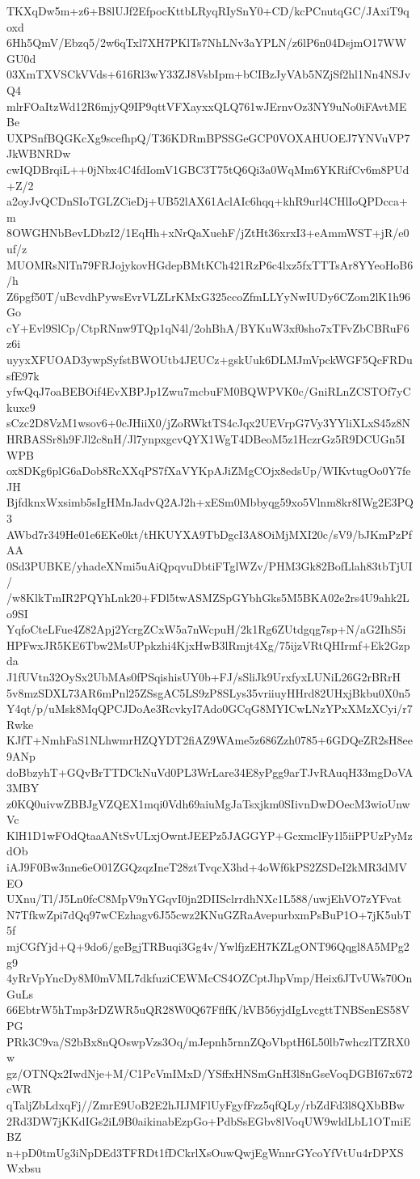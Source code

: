 TKXqDw5m+z6+B8lUJf2EfpocKttbLRyqRIySnY0+CD/kcPCnutqGC/JAxiT9qoxd
6Hh5QmV/Ebzq5/2w6qTxl7XH7PKlTs7NhLNv3aYPLN/z6lP6n04DsjmO17WWGU0d
03XmTXVSCkVVds+616Rl3wY33ZJ8VsbIpm+bCIBzJyVAb5NZjSf2hl1Nn4NSJvQ4
mlrFOaItzWd12R6mjyQ9IP9qttVFXayxxQLQ761wJErnvOz3NY9uNo0iFAvtMEBe
UXPSnfBQGKcXg9scefhpQ/T36KDRmBPSSGeGCP0VOXAHUOEJ7YNVuVP7JkWBNRDw
cwIQDBrqiL++0jNbx4C4fdIomV1GBC3T75tQ6Qi3a0WqMm6YKRifCv6m8PUd+Z/2
a2oyJvQCDnSIoTGLZCieDj+UB52lAX61AclAIc6hqq+khR9url4CHlIoQPDcca+m
8OWGHNbBevLDbzI2/1EqHh+xNrQaXuehF/jZtHt36xrxI3+eAmmWST+jR/e0uf/z
MUOMRsNlTn79FRJojykovHGdepBMtKCh421RzP6c4lxz5fxTTTsAr8YYeoHoB6/h
Z6pgf50T/uBcvdhPywsEvrVLZLrKMxG325ccoZfmLLYyNwIUDy6CZom2lK1h96Go
cY+Evl9SlCp/CtpRNnw9TQp1qN4l/2ohBhA/BYKuW3xf0sho7xTFvZbCBRuF6z6i
uyyxXFUOAD3ywpSyfstBWOUtb4JEUCz+gskUuk6DLMJmVpckWGF5QcFRDusfE97k
yfwQqJ7oaBEBOif4EvXBPJp1Zwu7mcbuFM0BQWPVK0c/GniRLnZCSTOf7yCkuxc9
sCzc2D8VzM1wsov6+0cJHiiX0/jZoRWktTS4cJqx2UEVrpG7Vy3YYliXLxS45z8N
HRBASSr8h9FJl2c8nH/Jl7ynpxgcvQYX1WgT4DBeoM5z1HczrGz5R9DCUGn5IWPB
ox8DKg6plG6aDob8RcXXqPS7fXaVYKpAJiZMgCOjx8edsUp/WIKvtugOo0Y7feJH
BjfdknxWxsimb5sIgHMnJadvQ2AJ2h+xESm0Mbbyqg59xo5Vlnm8kr8IWg2E3PQ3
AWbd7r349He01e6EKe0kt/tHKUYXA9TbDgcI3A8OiMjMXI20c/sV9/bJKmPzPfAA
0Sd3PUBKE/yhadeXNmi5uAiQpqvuDbtiFTglWZv/PHM3Gk82BofLlah83tbTjUI/
/w8KlkTmIR2PQYhLnk20+FDl5twASMZSpGYbhGks5M5BKA02e2rs4U9ahk2Lo9SI
YqfoCteLFue4Z82Apj2YcrgZCxW5a7nWcpuH/2k1Rg6ZUtdgqg7sp+N/aG2IhS5i
HPFwxJR5KE6Tbw2MsUPpkzhi4KjxHwB3lRmjt4Xg/75ijzVRtQHIrmf+Ek2Gzpda
J1fUVtn32OySx2UbMAs0fPSqishisUY0b+FJ/sSliJk9UrxfyxLUNiL26G2rBRrH
5v8mzSDXL73AR6mPnl25ZSsgAC5LS9zP8SLys35vriiuyHHrd82UHxjBkbu0X0n5
Y4qt/p/uMsk8MqQPCJDoAe3RcvkyI7Ado0GCqG8MYICwLNzYPxXMzXCyi/r7Rwke
KJfT+NmhFaS1NLhwmrHZQYDT2fiAZ9WAme5z686Zzh0785+6GDQeZR2sH8ee9ANp
doBbzyhT+GQvBrTTDCkNuVd0PL3WrLare34E8yPgg9arTJvRAuqH33mgDoVA3MBY
z0KQ0uivwZBBJgVZQEX1mqi0Vdh69aiuMgJaTsxjkm0SIivnDwDOecM3wioUnwVc
KlH1D1wFOdQtaaANtSvULxjOwntJEEPz5JAGGYP+GcxmclFy1l5iiPPUzPyMzdOb
iAJ9F0Bw3nne6eO01ZGQzqzIneT28ztTvqcX3hd+4oWf6kPS2ZSDeI2kMR3dMVEO
UXnu/Tl/J5Ln0fcC8MpV9nYGqvI0jn2DIISclrrdhNXc1L588/uwjEhVO7zYFvat
N7TfkwZpi7dQq97wCEzhagv6J55cwz2KNuGZRaAvepurbxmPsBuP1O+7jK5ubT5f
mjCGfYjd+Q+9do6/geBgjTRBuqi3Gg4v/YwlfjzEH7KZLgONT96Qqgl8A5MPg2g9
4yRrVpYncDy8M0mVML7dkfuziCEWMcCS4OZCptJhpVmp/Heix6JTvUWs70OnGuLs
66EbtrW5hTmp3rDZWR5uQR28W0Q67FflfK/kVB56yjdIgLvcgttTNBSenES58VPG
PRk3C9va/S2bBx8nQOswpVzs3Oq/mJepnh5rnnZQoVbptH6L50lb7whczlTZRX0w
gz/OTNQx2IwdNje+M/C1PcVmIMxD/YSffxHNSmGnH3l8nGseVoqDGBI67x672cWR
qTaljZbLdxqFj//ZmrE9UoB2E2hJIJMFlUyFgyfFzz5qfQLy/rbZdFd3l8QXbBBw
2Rd3DW7jKKdIGs2iL9B0aikinabEzpGo+PdbSsEGbv8lVoqUW9wldLbL1OTmiEBZ
n+pD0tmUg3iNpDEd3TFRDt1fDCkrlXsOuwQwjEgWnnrGYcoYfVtUu4rDPXSWxbsu
